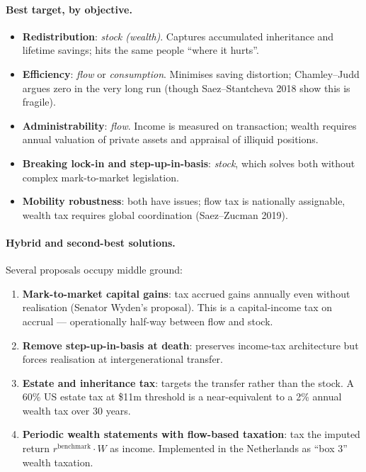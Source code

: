 \documentclass[11pt,a4paper]{article}
\begin{document}
\paragraph{Best target, by objective.}
\begin{itemize}[leftmargin=*,itemsep=2pt]
    \item \textbf{Redistribution}: \emph{stock (wealth)}. Captures accumulated inheritance and lifetime savings; hits the same people ``where it hurts''.
    \item \textbf{Efficiency}: \emph{flow} or \emph{consumption}. Minimises saving distortion; Chamley--Judd argues zero in the very long run (though Saez--Stantcheva 2018 show this is fragile).
    \item \textbf{Administrability}: \emph{flow}. Income is measured on transaction; wealth requires annual valuation of private assets and appraisal of illiquid positions.
    \item \textbf{Breaking lock-in and step-up-in-basis}: \emph{stock}, which solves both without complex mark-to-market legislation.
    \item \textbf{Mobility robustness}: both have issues; flow tax is nationally assignable, wealth tax requires global coordination (Saez--Zucman 2019).
\end{itemize}

\paragraph{Hybrid and second-best solutions.}
Several proposals occupy middle ground:
\begin{enumerate}[leftmargin=*,itemsep=1pt]
    \item \textbf{Mark-to-market capital gains}: tax accrued gains annually even without realisation (Senator Wyden's proposal). This is a capital-income tax on accrual --- operationally half-way between flow and stock.
    \item \textbf{Remove step-up-in-basis at death}: preserves income-tax architecture but forces realisation at intergenerational transfer.
    \item \textbf{Estate and inheritance tax}: targets the transfer rather than the stock. A 60\% US estate tax at \$11m threshold is a near-equivalent to a 2\% annual wealth tax over 30 years.
    \item \textbf{Periodic wealth statements with flow-based taxation}: tax the imputed return $r^{\text{benchmark}}\cdot W$ as income. Implemented in the Netherlands as ``box 3'' wealth taxation.
\end{enumerate}
\end{document}
